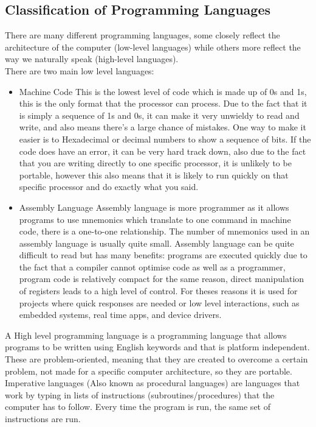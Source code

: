 \subsection{Classification of Programming Languages}
  \noindent
  There are many different programming languages, some closely reflect the architecture of the computer (low-level languages) while others more reflect the way we naturally speak (high-level languages).\\
  There are two main low level languages:
  \begin{itemize}
    \item Machine Code
      \subitem This is the lowest level of code which is made up of 0s and 1s, this is the only format that the processor can process. Due to the fact that it is simply a sequence of 1s and 0s, it can make it very unwieldy to read and write, and also means there's a large chance of mistakes. One way to make it easier is to Hexadecimal or decimal numbers to show a sequence of bits. If the code does have an error, it can be very hard track down, also due to the fact that you are writing directly to one specific processor, it is unlikely to be portable, however this also means that it is likely to run quickly on that specific processor and do exactly what you said.
    \item Assembly Language
      \subitem Assembly language is more programmer as it allows programs to use mnemonics which translate to one command in machine code, there is a one-to-one relationship. The number of mnemonics used in an assembly language is usually quite small. Assembly language can be quite difficult to read but has many benefits: programs are executed quickly due to the fact that a compiler cannot optimise code as well as a programmer, program code is relatively compact for the same reason, direct manipulation of registers leads to a high level of control. For theses reasons it is used for projects where quick responses are needed or low level interactions, such as embedded systems, real time apps, and device drivers.
  \end{itemize}
  A High level programming language is a programming language that allows programs to be written using English keywords and that is platform independent. These are problem-oriented, meaning that they are created to overcome a certain problem, not made for a specific computer architecture, so they are portable. Imperative languages (Also known as procedural languages) are languages that work by typing in lists of instructions (subroutines/procedures) that the computer has to follow. Every time the program is run, the same set of instructions are run.\\
